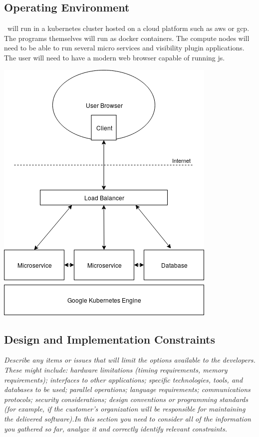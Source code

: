     \subsection{Operating Environment}\label{sec:operating-environment}
        \projectName\ will run in a \gls{kubernetes} cluster hosted on a cloud platform such as \gls{aws} or \gls{gcp}. The programs themselves will run as \gls{docker} containers. The compute nodes will need to be able to run several micro services and visibility plugin applications. The user will need to have a modern web browser capable of running \gls{js}. 
        \begin{center}
            \includegraphics[width=.7\textwidth]{images/Operating-Environment.png}
        \end{center}
    \subsection{Design and Implementation Constraints}\label{sec:design-constraints}
        \emph{Describe any items or issues that will limit the options available to the developers. These might include: hardware limitations (timing requirements, memory requirements); interfaces to other applications; specific technologies, tools, and databases to be used; parallel operations; language requirements; communications protocols; security considerations; design conventions or programming standards (for example, if the customer’s organization will be responsible for maintaining the delivered software).\gnl In this section you need to consider all of the information you gathered so far, analyze it and correctly identify relevant constraints.}
